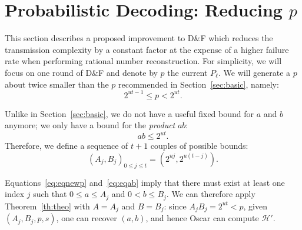 \documentclass[twoside,envcountsame,runningheads]{llncs}
\newcommand{\Prob}[1]{{\Pr\left[\,{#1}\,\right]}}
\newcommand{\Set}{\mathcal{H}}
\newcommand{\df}{D\&F\xspace}
\begin{document}
%


\section{Probabilistic Decoding: Reducing $p$}
\label{ap:probabilistic}

This section describes a proposed improvement to \df which reduces the transmission complexity by a constant factor at the expense of a higher failure rate when performing rational number reconstruction. For simplicity, we will focus on one round of \df and denote by $p$ the current $P_\ell$. We will generate a $p$ about twice smaller than the $p$ recommended in Section~\ref{sec:basic}, namely:
\begin{equation}
\label{eq:eqnewp}
2^{ut-1}\leq p < 2^{ut}.
\end{equation}

Unlike in Section~\ref{sec:basic}, we do not have a useful fixed bound for $a$ and $b$ anymore; we only have a bound for the \textit{product} $a b$: 
\begin{equation}
\label{eq:eqab}
ab \leq 2^{ut}.
\end{equation} 
Therefore, we define a sequence of $t+1$ couples of possible bounds:
\[\left(A_j, B_j\right)_{0 \leq j \leq t} = \left(2^{uj}, 2^{u(t-j)}\right). \]

Equations~\eqref{eq:eqnewp} and~\eqref{eq:eqab} imply that there must exist at least one index $j$ such that $0 \leq a \leq A_j$ and $0 <b \leq B_j$. 
We can therefore apply Theorem~\ref{th:theo} with $A = A_j$ and $B = B_j$: since $A_j B_j = 2^{ut} < p$, given $(A_j,B_j,p,s)$, one can recover $(a,b)$, and hence Oscar can compute $\Set'$.
\end{document}
